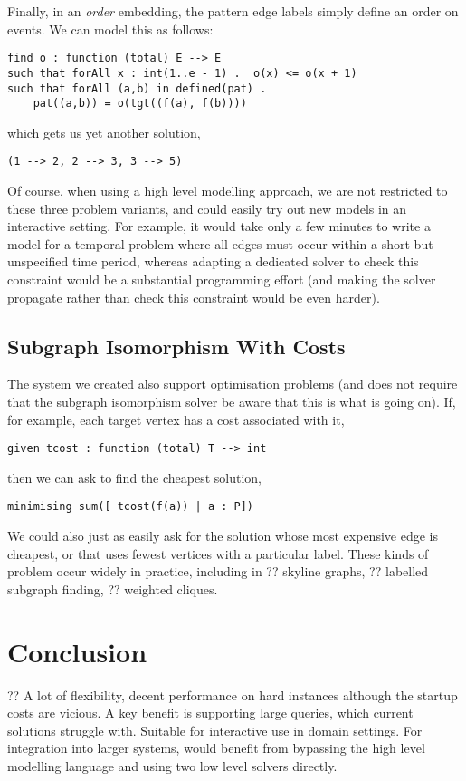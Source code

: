 \documentclass[runningheads]{llncs}
\begin{document}
Finally, in an \emph{order} embedding, the pattern edge labels simply define an order on events. We
can model this as follows:
\begin{lstlisting}
find o : function (total) E --> E
such that forAll x : int(1..e - 1) .  o(x) <= o(x + 1)
such that forAll (a,b) in defined(pat) .
    pat((a,b)) = o(tgt((f(a), f(b))))
\end{lstlisting}
which gets us yet another solution,
\begin{lstlisting}
(1 --> 2, 2 --> 3, 3 --> 5)
\end{lstlisting}

Of course, when using a high level modelling approach, we are not restricted to these three problem
variants, and could easily try out new models in an interactive setting. For example, it would take
only a few minutes to write a model for a temporal problem where all edges must occur within a short
but unspecified time period, whereas adapting a dedicated solver to check this constraint would be a
substantial programming effort (and making the solver propagate rather than check this constraint
would be even harder).

\subsection{Subgraph Isomorphism With Costs}

The system we created also support optimisation problems (and does not require that the subgraph
isomorphism solver be aware that this is what is going on). If, for example, each target vertex has
a cost associated with it,
\begin{lstlisting}
given tcost : function (total) T --> int
\end{lstlisting}
then we can ask to find the cheapest solution,
\begin{lstlisting}
minimising sum([ tcost(f(a)) | a : P])
\end{lstlisting}
We could also just as easily ask for the solution whose most expensive edge is cheapest, or that
uses fewest vertices with a particular label. These kinds of problem occur widely in practice,
including in ?? skyline graphs, ?? labelled subgraph finding, ?? weighted cliques.

\section{Conclusion}

?? A lot of flexibility, decent performance on hard instances although the startup costs are
vicious. A key benefit is supporting large queries, which current solutions struggle with. Suitable
for interactive use in domain settings. For integration into larger systems, would benefit from
bypassing the high level modelling language and using two low level solvers directly.



\end{document}
